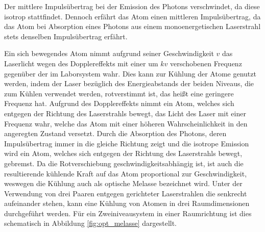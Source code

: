 \documentclass[11pt, a4paper]{article}
\numberwithin{equation}{section}
\begin{document}
Der mittlere Impulsübertrag bei der Emission des Photons verschwindet, da diese isotrop stattfindet.
Dennoch erfährt das Atom einen mittleren Impulsübertrag, da das Atom bei Absorption eines Photons aus einem monoenergetischen Laserstrahl stets denselben Impulsübertrag erfährt.

Ein sich bewegendes Atom nimmt aufgrund seiner Geschwindigkeit $v$ das Laserlicht wegen des Dopplereffekts mit einer um $kv$ verschobenen Frequenz gegenüber der im Laborsystem wahr.
Dies kann zur Kühlung der Atome genutzt werden, indem der Laser bezüglich des Energieabstands der beiden Niveaus, die zum Kühlen verwendet werden, rotverstimmt ist, das heißt eine geringere Frequenz hat.
Aufgrund des Dopplereffekts nimmt ein Atom, welches sich entgegen der Richtung des Laserstrahls bewegt, das Licht des Laser mit einer Frequenz wahr, welche das Atom mit einer höheren Wahrscheinlichkeit in den angeregten Zustand versetzt.
Durch die Absorption des Photons, deren Impulsübertrag immer in die gleiche Richtung zeigt und die isotrope Emission wird ein Atom, welches sich entgegen der Richtung des Laserstrahls bewegt, gebremst.
Da die Rotverschiebung geschwindigkeitsabhängig ist, ist auch die resultierende kühlende Kraft auf das Atom proportional zur Geschwindigkeit, weswegen die Kühlung auch als optische Melasse bezeichnet wird.
Unter der Verwendung von drei Paaren entgegen gerichteter Laserstrahlen die senkrecht aufeinander stehen, kann eine Kühlung von Atomen in drei Raumdimensionen durchgeführt werden.
Für ein Zweiniveausystem in einer Raumrichtung ist dies schematisch in Abbildung \ref{fig:opt_melasse} dargestellt.
\end{document}
